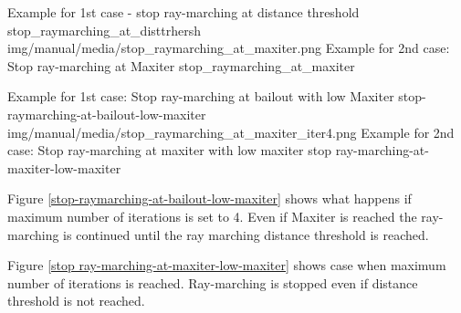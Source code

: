{Example for 1st case - stop ray-marching at distance threshold}
{stop_raymarching_at_disttrhersh}
{img/manual/media/stop_raymarching_at_maxiter.png}
{Example for 2nd case: Stop ray-marching at Maxiter}
{stop_raymarching_at_maxiter}

{Example for 1st case: Stop ray-marching at bailout with low Maxiter}
{stop-raymarching-at-bailout-low-maxiter}
{img/manual/media/stop_raymarching_at_maxiter_iter4.png}
{Example for 2nd case: Stop ray-marching at maxiter with low maxiter}
{stop ray-marching-at-maxiter-low-maxiter}

Figure \ref{stop-raymarching-at-bailout-low-maxiter} shows what happens if maximum number of iterations is set to 4. Even if Maxiter is reached the
ray-marching is continued until the ray marching distance threshold is reached.

Figure \ref{stop ray-marching-at-maxiter-low-maxiter} shows case when maximum number of iterations is reached. Ray-marching is stopped even
if distance threshold is not reached.

